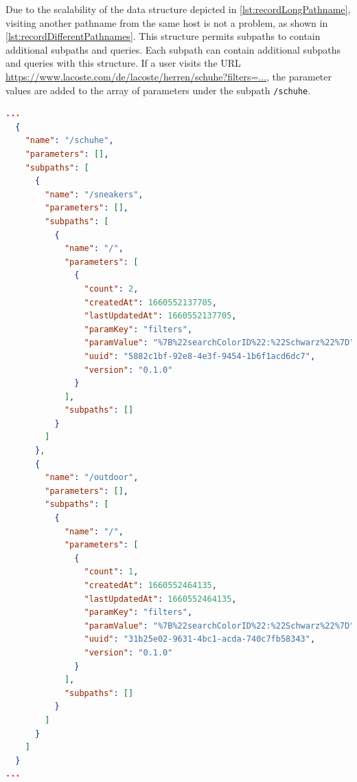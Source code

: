 Due to the scalability of the data structure depicted in \autoref{lst:recordLongPathname}, visiting another pathname from the same host is not a problem, as shown in \autoref{lst:recordDifferentPathnames}. This structure permits subpaths to contain additional subpaths and queries. Each subpath can contain additional subpaths and queries with this structure. If a user visits the URL \url{https://www.lacoste.com/de/lacoste/herren/schuhe?filters=...}, the parameter values are added to the array of parameters under the subpath \texttt{/schuhe}.

\begin{lstlisting}[language=json, caption={Record with different pathnames (JSON)}, label={lst:recordDifferentPathnames}]
...
  {
    "name": "/schuhe",
    "parameters": [],
    "subpaths": [
      {
        "name": "/sneakers",
        "parameters": [],
        "subpaths": [
          {
            "name": "/",
            "parameters": [
              {
                "count": 2,
                "createdAt": 1660552137705,
                "lastUpdatedAt": 1660552137705,
                "paramKey": "filters",
                "paramValue": "%7B%22searchColorID%22:%22Schwarz%22%7D",
                "uuid": "5882c1bf-92e8-4e3f-9454-1b6f1acd6dc7",
                "version": "0.1.0"
              }
            ],
            "subpaths": []
          }
        ]
      },
      {
        "name": "/outdoor",
        "parameters": [],
        "subpaths": [
          {
            "name": "/",
            "parameters": [
              {
                "count": 1,
                "createdAt": 1660552464135,
                "lastUpdatedAt": 1660552464135,
                "paramKey": "filters",
                "paramValue": "%7B%22searchColorID%22:%22Schwarz%22%7D",
                "uuid": "31b25e02-9631-4bc1-acda-740c7fb58343",
                "version": "0.1.0"
              }
            ],
            "subpaths": []
          }
        ]
      }
    ]
  }
...
\end{lstlisting}


